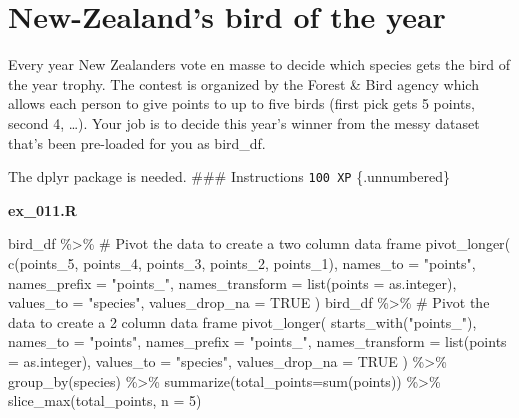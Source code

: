 \documentclass[
  letterpaper,
  DIV=11,
  numbers=noendperiod]{scrreprt}
\newenvironment{Shaded}{\begin{snugshade}}{\end{snugshade}}
\newcommand{\AttributeTok}[1]{\textcolor[rgb]{0.40,0.45,0.13}{#1}}
\newcommand{\CommentTok}[1]{\textcolor[rgb]{0.37,0.37,0.37}{#1}}
\newcommand{\ConstantTok}[1]{\textcolor[rgb]{0.56,0.35,0.01}{#1}}
\newcommand{\DecValTok}[1]{\textcolor[rgb]{0.68,0.00,0.00}{#1}}
\newcommand{\FunctionTok}[1]{\textcolor[rgb]{0.28,0.35,0.67}{#1}}
\newcommand{\NormalTok}[1]{\textcolor[rgb]{0.00,0.23,0.31}{#1}}
\newcommand{\SpecialCharTok}[1]{\textcolor[rgb]{0.37,0.37,0.37}{#1}}
\newcommand{\StringTok}[1]{\textcolor[rgb]{0.13,0.47,0.30}{#1}}
\begin{document}
\hypertarget{new-zealands-bird-of-the-year}{%
\section{New-Zealand's bird of the
year}\label{new-zealands-bird-of-the-year}}

Every year New Zealanders vote en masse to decide which species gets the
bird of the year trophy. The contest is organized by the Forest \& Bird
agency which allows each person to give points to up to five birds
(first pick gets 5 points, second 4, \ldots). Your job is to decide this
year's winner from the messy dataset that's been pre-loaded for you as
bird\_df.

The dplyr package is needed. \#\#\# Instructions \texttt{100\ XP}
\{.unnumbered\}

\textbf{ex\_011.R}

\begin{Shaded}
\begin{Highlighting}[]
\NormalTok{bird\_df }\SpecialCharTok{\%\textgreater{}\%}
  \CommentTok{\# Pivot the data to create a two column data frame}
  \FunctionTok{pivot\_longer}\NormalTok{(}
    \FunctionTok{c}\NormalTok{(points\_5, points\_4, points\_3, points\_2, points\_1),}
    \AttributeTok{names\_to =} \StringTok{"points"}\NormalTok{,}
    \AttributeTok{names\_prefix =} \StringTok{"points\_"}\NormalTok{,}
    \AttributeTok{names\_transform =} \FunctionTok{list}\NormalTok{(}\AttributeTok{points =}\NormalTok{ as.integer),}
    \AttributeTok{values\_to =} \StringTok{"species"}\NormalTok{,}
    \AttributeTok{values\_drop\_na =} \ConstantTok{TRUE}
\NormalTok{  )}
\NormalTok{bird\_df }\SpecialCharTok{\%\textgreater{}\%}
  \CommentTok{\# Pivot the data to create a 2 column data frame}
  \FunctionTok{pivot\_longer}\NormalTok{(}
    \FunctionTok{starts\_with}\NormalTok{(}\StringTok{"points\_"}\NormalTok{),}
    \AttributeTok{names\_to =} \StringTok{"points"}\NormalTok{,}
    \AttributeTok{names\_prefix =} \StringTok{"points\_"}\NormalTok{,}
    \AttributeTok{names\_transform =} \FunctionTok{list}\NormalTok{(}\AttributeTok{points =}\NormalTok{ as.integer),}
    \AttributeTok{values\_to =} \StringTok{"species"}\NormalTok{,}
    \AttributeTok{values\_drop\_na =} \ConstantTok{TRUE}
\NormalTok{  ) }\SpecialCharTok{\%\textgreater{}\%}
  \FunctionTok{group\_by}\NormalTok{(species) }\SpecialCharTok{\%\textgreater{}\%} 
  \FunctionTok{summarize}\NormalTok{(}\AttributeTok{total\_points=}\FunctionTok{sum}\NormalTok{(points)) }\SpecialCharTok{\%\textgreater{}\%} 
  \FunctionTok{slice\_max}\NormalTok{(total\_points, }\AttributeTok{n =} \DecValTok{5}\NormalTok{)}
\end{Highlighting}
\end{Shaded}
\end{document}
